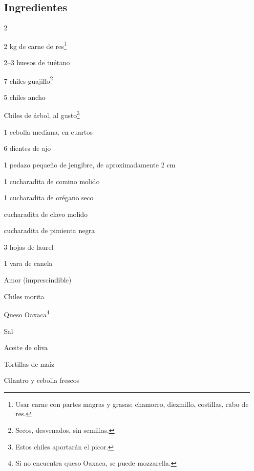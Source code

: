 \newpage
{}

\vspace*{-0.6cm}
\subsection*{Ingredientes}
\vspace*{-0.4cm}
\begin{multicols}{2}

    \begin{ingredients}
        \item 2 kg de carne de res\footnote{Usar carne con partes magras y grasas: chamorro, diezmillo, costillas, rabo de res.}
        \item 2--3 huesos de tuétano
        \item 7 chiles guajillo\footnote{\label{note:chiles}Secos, desvenados, sin semillas.}
        \item 5 chiles ancho
        \item Chiles de árbol, al gusto\footnote{Estos chiles aportarán el picor.}
        \item 1 cebolla mediana, en cuartos
        \item 6 dientes de ajo
        \item 1 pedazo pequeño de jengibre, de aproximadamente 2 cm
        \item 1 cucharadita de comino molido
        \item 1 cucharadita de orégano seco
        \item {} cucharadita de clavo molido
        \item {} cucharadita de pimienta negra
        \item 3 hojas de laurel
        \item 1 vara de canela
        \item Amor (imprescindible)
        \item Chiles morita
        \item Queso Oaxaca\footnote{Si no encuentra queso Oaxaca, se puede mozzarella.}
        \item Sal
        \item Aceite de oliva
        \item Tortillas de maíz
        \item Cilantro y cebolla frescos
    \end{ingredients}
\end{multicols}

